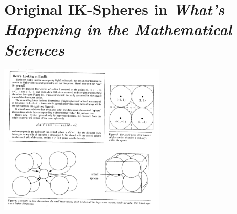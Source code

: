 \section{Original IK-Spheres in \textit{What's Happening in the Mathematical Sciences}}
\centering
\includegraphics[width=0.6\textwidth]{images/spheres.png}